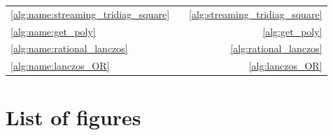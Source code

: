 \begin{landscape}
\begin{center}
\begin{tabularx}{\linewidth}{p{5.3cm}Xr}
    \ref{alg:name:streaming_tridiag_square} & \nameref{alg:streaming_tridiag_square}  & \cref{alg:streaming_tridiag_square} \\
    \ref{alg:name:get_poly} & \nameref{alg:get_poly}  & \cref{alg:get_poly} \\
    \ref{alg:name:rational_lanczos} & \nameref{alg:rational_lanczos}  & \cref{alg:rational_lanczos} \\
    \ref{alg:name:lanczos_OR} & \nameref{alg:lanczos_OR}  & \cref{alg:lanczos_OR} \\
    \bottomrule
\end{tabularx}
\end{center}
\end{landscape}


\section{List of figures}
\makeatletter
{
\fontsize{11}{13}\selectfont
{}%
}
\makeatother

